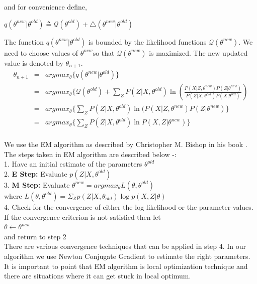 \documentclass[12pt,draft]{dalcsthesis}
\begin{document}
and for convenience define,

$q(\theta^{new}|\theta^{old})\triangleq\mathcal{Q}(\theta^{old})+\triangle(\theta^{new}|\theta^{old})$

The function $q(\theta^{new}|\theta^{old})$ is bounded by the likelihood
functions $\mathcal{Q}(\theta^{new})$. We need to choose values of
$\theta^{new}$so that $\mathcal{Q}(\theta^{new})$ is maximized.
The new updated value is denoted by $\theta_{n+1}.$
\begin{eqnarray}
\theta_{n+1} & = & argmax_{\theta}\{q(\theta^{new}|\theta^{old})\}\\
 & = & argmax_{\theta}\{\mathcal{Q}(\theta^{old})+\sum_{Z}P(Z|X,\theta^{old})\ln(\frac{P(X|Z,\theta^{new})P(Z|\theta^{new})}{P(Z|X,\theta^{old})P(X|\theta^{old})})\\
 & = & argmax_{\theta}\{\sum_{Z}P(Z|X,\theta^{old})\ln(P(X|Z,\theta^{new})P(Z|\theta^{new})\}\\
 & = & argmax_{\theta}\{\sum_{Z}P(Z|X,\theta^{old})\ln P(X,Z|\theta^{new})\}\\
\end{eqnarray}

We use the EM algorithm as described by Christopher M. Bishop in his book \cite{bishop2006pattern}. The steps taken in EM algorithm are described below -:
\\
1. Have an initial estimate of the parameters $\theta ^{old}$
\\
2. \textbf{E Step:} Evaluate $p(Z|X,\theta^{old})$
\\
3. \textbf{M Step:} Evaluate $\theta ^{new} = arg max _{\theta} L(\theta,\theta^{old})$
\\
\hspace*{20 mm} where 
$L(\theta,\theta^{old})=\Sigma _{Z} p(Z|X,\theta_{old}) \log p(X,Z|\theta)$
\\
4. Check for the convergence of either the log likelihood or the parameter values. If the convergence criterion is not satisfied then let
\\
\hspace*{20 mm} $\theta \leftarrow \theta^{new} $
\\
and return to step 2
\\
There are various convergence techniques that can be applied in step 4. In our algorithm we use Newton Conjugate Gradient to estimate the right parameters. It is important to point that EM algorithm is local optimization technique and there are situations where it can get stuck in local optimum. 		
\end{document}
